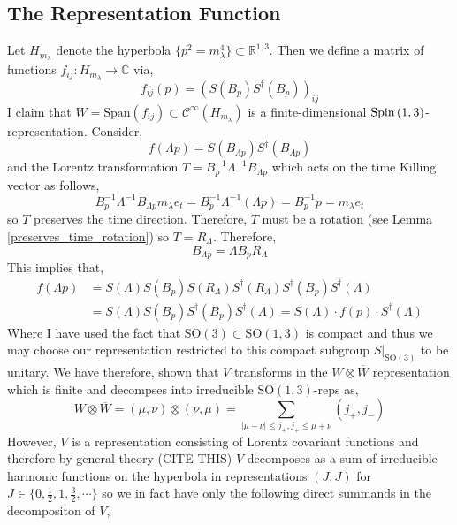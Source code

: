 \documentclass[12pt]{extarticle}
\newcommand{\R}{\mathbb{R}}
\theoremstyle{definition}
\newcommand{\SO}[1]{\mathrm{SO}\left(#1\right)}
\newcommand{\C}{\mathbb{C}}
\begin{document}
\subsection{The Representation Function}

Let $H_{m_\lambda}$ denote the hyperbola $\{ p^2 = m_\lambda^4 \} \subset \R^{1,3}$. Then we define a matrix of functions $f_{ij} : H_{m_\lambda} \to \C$ via,
\begin{equation}
f_{ij}(p) = (S(B_p) S^\dagger(B_p))_{ij}
\end{equation}
I claim that $W = \mathrm{Span}(f_{ij}) \subset \mathcal{C}^\infty(H_{m_\lambda})$ is a finite-dimensional $\mathrm{Spin}\left( 1,3 \right)$-representation. Consider,
\begin{equation}
f(\Lambda p) = S(B_{\Lambda p}) S^\dagger(B_{\Lambda p})
\end{equation}
and the Lorentz transformation $T = B_p^{-1} \Lambda^{-1} B_{\Lambda p}$ which acts on the time Killing vector as follows,
\begin{equation}
B_p^{-1} \Lambda^{-1} B_{\Lambda p} m_\lambda e_t 
= B_p^{-1} \Lambda^{-1} (\Lambda p) = B_p^{-1} p = m_\lambda e_t
\end{equation}
so $T$ preserves the time direction. Therefore, $T$ must be a rotation (see Lemma \ref{preserves_time_rotation}) so $T = R_{\Lambda}$. Therefore,
\begin{equation}
B_{\Lambda p} = \Lambda B_p R_{\Lambda} 
\end{equation}
This implies that,
\begin{subequations}
\begin{align}
f(\Lambda p) & = S(\Lambda) S(B_p) S(R_{\Lambda}) S^\dagger(R_{\Lambda}) S^\dagger(B_p) S^\dagger(\Lambda) 
\\
& = S(\Lambda) S(B_p) S^\dagger(B_p) S^\dagger(\Lambda) =  S(\Lambda) \cdot f(p) \cdot S^\dagger(\Lambda) 
\end{align}
\end{subequations}
Where I have used the fact that $\SO{3} \subset \SO{1,3}$ is compact and thus we may choose our representation restricted to this compact subgroup $S|_{\SO{3}}$ to be unitary. We have therefore, shown that $V$ transforms in the $W \otimes \overline{W}$ representation which is finite and decompses into irreducible $\SO{1,3}$-reps as,
\begin{equation}
W \otimes \overline{W} = (\mu, \nu) \otimes (\nu, \mu) = \sum_{| \mu - \nu | \le j_{+}, j_{+} \le \mu + \nu} (j_{+}, j_{-})
\end{equation} 
However, $V$ is a representation consisting of Lorentz covariant functions and therefore by general theory (CITE THIS) $V$ decomposes as a sum of irreducible harmonic functions on the hyperbola in representations $(J, J)$ for $J \in \{ 0, \tfrac{1}{2}, 1, \tfrac{3}{2}, \cdots \}$ so we in fact have only the following direct summands in the decompositon of $V$,
\end{document}
